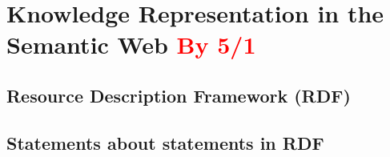 \section{Knowledge Representation in the Semantic Web \textcolor{red}{By 5/1}}
\label{sec:chp2_semweb}

\subsection{Resource Description Framework (RDF)}

\subsection{Statements about statements in RDF}
